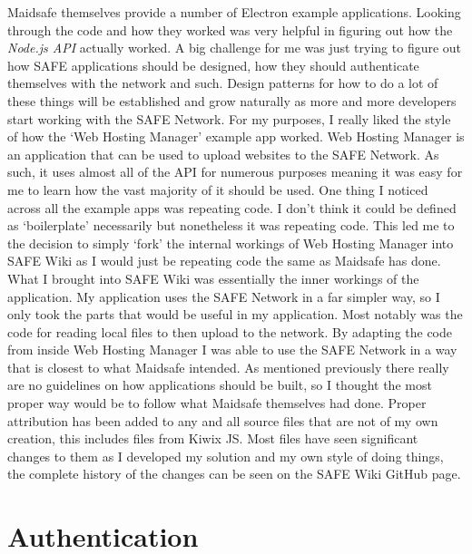 Maidsafe themselves provide a number of Electron example applications\cite{example-apps}. Looking through the code and how they worked was very helpful in figuring out how the \textit{Node.js API} actually worked. A big challenge for me was just trying to figure out how SAFE applications should be designed, how they should authenticate themselves with the network and such. Design patterns for how to do a lot of these things will be established and grow naturally as more and more developers start working with the SAFE Network. For my purposes, I really liked the style of how the `Web Hosting Manager'\cite{web-hosting-manager} example app worked. Web Hosting Manager is an application that can be used to upload websites to the SAFE Network. As such, it uses almost all of the API for numerous purposes meaning it was easy for me to learn how the vast majority of it should be used. One thing I noticed across all the example apps was repeating code. I don't think it could be defined as `boilerplate' necessarily but nonetheless it was repeating code. This led me to the decision to simply `fork' the internal workings of Web Hosting Manager into SAFE Wiki as I would just be repeating code the same as Maidsafe has done. What I brought into SAFE Wiki was essentially the inner workings of the application. My application uses the SAFE Network in a far simpler way, so I only took the parts that would be useful in my application. Most notably was the code for reading local files to then upload to the network. By adapting the code from inside Web Hosting Manager I was able to use the SAFE Network in a way that is closest to what Maidsafe intended. As mentioned previously there really are no guidelines on how applications should be built, so I thought the most proper way would be to follow what Maidsafe themselves had done. Proper attribution has been added to any and all source files that are not of my own creation, this includes files from Kiwix JS. Most files have seen significant changes to them as I developed my solution and my own style of doing things, the complete history of the changes can be seen on the SAFE Wiki GitHub page.

\section{Authentication}

